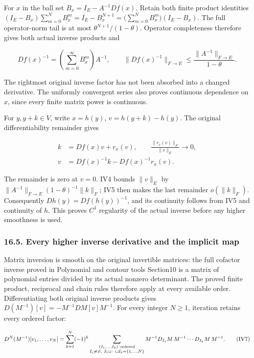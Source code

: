 \documentclass[
  11pt,
]{article}
\begin{document}
For \(x\) in the ball set \(B_x=I_E-A^{-1}Df(x)\). Retain both finite
product identities \((I_E-B_x)\sum_{m=0}^N B_x^m=I_E-B_x^{N+1}
=\bigl(\sum_{m=0}^N B_x^m\bigr)(I_E-B_x)\). The full operator-norm tail
is at most \(\theta^{N+1}/(1-\theta)\). Operator completeness therefore
gives both actual inverse products and

\[
 Df(x)^{-1}=\left(\sum_{m=0}^{\infty}B_x^m\right)A^{-1},
 \qquad
 \|Df(x)^{-1}\|_{F\to E}
       \leq\frac{\|A^{-1}\|_{F\to E}}{1-\theta}.
 \tag{IV5}
\]

The rightmost original inverse factor has not been absorbed into a
changed derivative. The uniformly convergent series also proves
continuous dependence on \(x\), since every finite matrix power is
continuous.

For \(y,y+k\in V\), write \(x=h(y)\), \(v=h(y+k)-h(y)\). The original
differentiability remainder gives

\[
 \begin{aligned}
 k&=Df(x)v+r_x(v),\qquad
          \frac{\|r_x(v)\|_F}{\|v\|_E}\longrightarrow0,\\
 v&=Df(x)^{-1}k-Df(x)^{-1}r_x(v).
 \end{aligned}
 \tag{IV6}
\]

The remainder is zero at \(v=0\). IV4 bounds \(\|v\|_E\) by
\(\|A^{-1}\|_{F\to E}(1-\theta)^{-1}\|k\|_F\); IV5 then makes the last
remainder \(o(\|k\|_F)\). Consequently \(Dh(y)=Df(h(y))^{-1}\), and its
continuity follows from IV5 and continuity of \(h\). This proves \(C^1\)
regularity of the actual inverse before any higher smoothness is used.

\subsubsection{16.5. Every higher inverse derivative and the implicit
map}\label{every-higher-inverse-derivative-and-the-implicit-map}

Matrix inversion is smooth on the original invertible matrices: the full
cofactor inverse proved in Polynomial and contour tools Section10 is a
matrix of polynomial entries divided by its actual nonzero determinant.
The proved finite product, reciprocal and chain rules therefore apply at
every available order. Differentiating both original inverse products
gives \(D(M^{-1})[v]=-M^{-1}DM[v]M^{-1}\). For every integer \(N\geq1\),
iteration retains every ordered factor:

\[
 D^N(M^{-1})[v_1,\ldots,v_N]
 =\sum_{k=1}^N(-1)^k
   \sum_{\substack{(I_1,\ldots,I_k)\ {\rm ordered}\\
                   I_j\ne\varnothing,\ 
                   I_1\sqcup\cdots\sqcup I_k=\{1,\ldots,N\}}}
 M^{-1}D_{I_1}M\,M^{-1}\cdots
             D_{I_k}M\,M^{-1}.
 \tag{IV7}
\]
\end{document}
